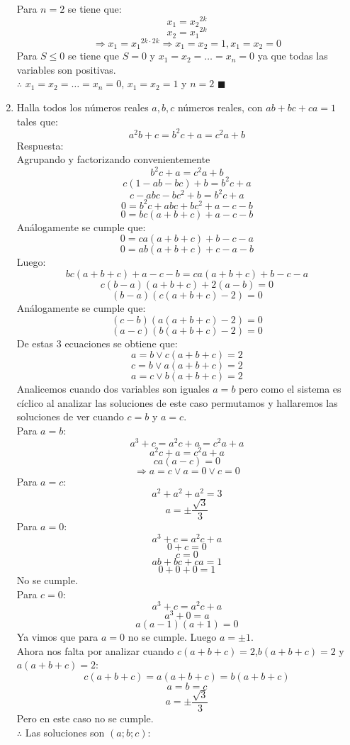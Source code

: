 \documentclass{book}
\begin{document}
\begin{enumerate}
          Para $n=2$ se tiene que:
          $$x_1={x_2}^{2k}$$
          $$x_2={x_1}^{2k}$$
          $$\Rightarrow x_1={x_1}^{2k\cdot 2k}\Rightarrow  x_1=x_2=1,x_1=x_2=0$$
          Para $S\leq 0$ se tiene que $S=0$ y $x_1=x_2=\ldots=x_n=0$ ya que todas las variables son positivas.\\
          $\therefore$ $x_1=x_2=\ldots=x_n=0$, $x_1=x_2=1$ y $n=2$ $\blacksquare$\\
    \item Halla todos los números reales $a,b,c$ números reales, con $ab+bc+ca=1$ tales que:
          $$a^2b+c=b^2c+a=c^2a+b$$
          Respuesta:\\
          Agrupando y factorizando convenientemente
          $$b^2 c+a=c^2 a+b$$
          $$c(1-ab-bc)+b=b^2 c+a$$
          $$c-abc-bc^2+b=b^2 c+a$$
          $$0=b^2 c+abc+bc^2+a-c-b$$
          $$0=bc(a+b+c)+a-c-b$$
          Análogamente se cumple que:
          $$0=ca(a+b+c)+b-c-a$$
          $$0=ab(a+b+c)+c-a-b$$
          Luego:
          $$bc(a+b+c)+a-c-b=ca(a+b+c)+b-c-a$$
          $$c(b-a)(a+b+c)+2(a-b)=0$$
          $$(b-a)(c(a+b+c)-2)=0$$
          Análogamente se cumple que:
          $$(c-b)(a(a+b+c)-2)=0$$
          $$(a-c)(b(a+b+c)-2)=0$$
          De estas 3 ecuaciones se obtiene que:
          $$a=b \vee c(a+b+c)=2$$
          $$c=b \vee a(a+b+c)=2$$
          $$a=c \vee b(a+b+c)=2$$
          Analicemos cuando dos variables son iguales $a=b$ pero como el sistema es cíclico al analizar las soluciones de este caso permutamos y hallaremos las soluciones de ver cuando $c=b$ y $a=c$.\\
          Para $a=b$:
          $$a^3+c=a^2 c+a=c^2 a+a$$
          $$a^2 c+a=c^2 a+a$$
          $$ca(a-c)=0$$
          $$\Rightarrow a=c \vee a=0 \vee c=0$$
          Para $a=c$:
          $$a^2+a^2+a^2=3$$
          $$a=\pm\frac{\sqrt{3}}{3}$$
          Para $a=0$:
          $$a^3+c=a^2 c+a$$
          $$0+c=0$$
          $$c=0$$
          $$ab+bc+ca=1$$
          $$0+0+0=1$$
          No se cumple.\\
          Para $c=0$:
          $$a^3+c=a^2 c+a$$
          $$a^3+0=a$$
          $$a(a-1)(a+1)=0$$
          Ya vimos que para $a=0$ no se cumple. Luego $a=\pm 1$.\\
          Ahora nos falta por analizar cuando $c(a+b+c)=2$,$b(a+b+c)=2$ y $a(a+b+c)=2$:
          $$c(a+b+c)=a(a+b+c)=b(a+b+c)$$
          $$a=b=c$$
          $$a=\pm\frac{\sqrt{3}}{3}$$
          Pero en este caso no se cumple.\\
          $\therefore$ Las soluciones son $(a;b;c)$:

\end{enumerate}
\end{document}
